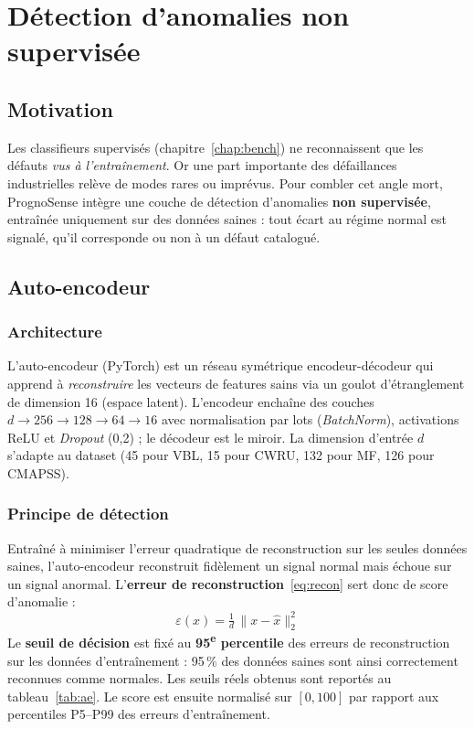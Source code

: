 \chapter{Détection d'anomalies non supervisée}
\label{chap:anomalie}

\section{Motivation}
Les classifieurs supervisés (chapitre~\ref{chap:bench}) ne reconnaissent que les défauts
\emph{vus à l'entraînement}. Or une part importante des défaillances industrielles relève de
modes rares ou imprévus. Pour combler cet angle mort, PrognoSense intègre une couche de
détection d'anomalies \textbf{non supervisée}, entraînée uniquement sur des données saines :
tout écart au régime normal est signalé, qu'il corresponde ou non à un défaut catalogué.

\section{Auto-encodeur}
\subsection{Architecture}
L'auto-encodeur (PyTorch) est un réseau symétrique encodeur-décodeur qui apprend à
\emph{reconstruire} les vecteurs de features sains via un goulot d'étranglement de dimension
16 (espace latent). L'encodeur enchaîne des couches $d \to 256 \to 128 \to 64 \to 16$ avec
normalisation par lots (\emph{BatchNorm}), activations ReLU et \emph{Dropout} (0{,}2) ; le
décodeur est le miroir. La dimension d'entrée $d$ s'adapte au dataset (45 pour VBL, 15 pour
CWRU, 132 pour MF, 126 pour CMAPSS).

\subsection{Principe de détection}
Entraîné à minimiser l'erreur quadratique de reconstruction sur les seules données saines,
l'auto-encodeur reconstruit fidèlement un signal normal mais échoue sur un signal anormal.
L'\textbf{erreur de reconstruction}~\eqref{eq:recon} sert donc de score d'anomalie :
\begin{equation}
\varepsilon(x) = \tfrac{1}{d}\,\lVert x - \hat{x} \rVert_2^2
\label{eq:recon}
\end{equation}
Le \textbf{seuil de décision} est fixé au \textbf{95\textsuperscript{e} percentile} des
erreurs de reconstruction sur les données d'entraînement : 95\,\% des données saines sont
ainsi correctement reconnues comme normales. Les seuils réels obtenus sont reportés au
tableau~\ref{tab:ae}. Le score est ensuite normalisé sur $[0,100]$ par rapport aux
percentiles P5--P99 des erreurs d'entraînement.

